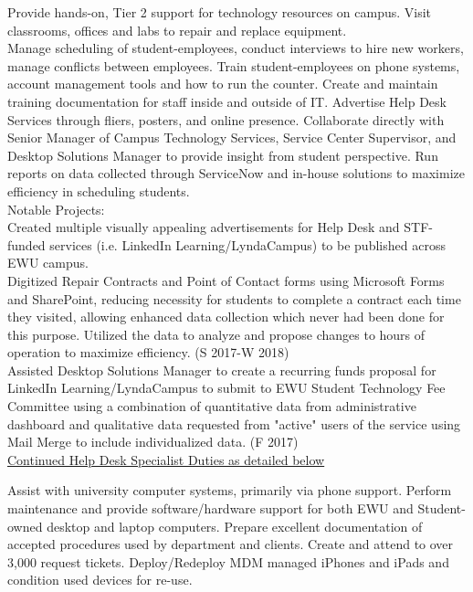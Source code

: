 \documentclass[]{deedy-resume-openfont}
\begin{document}
\begin{minipage}[t]{0.66\textwidth}
\sectionsep
{}
Provide hands-on, Tier 2 support for technology resources on campus. Visit classrooms, offices and labs to repair and replace equipment.
\sectionsep \\
Manage scheduling of student-employees, conduct interviews to hire new workers, manage conflicts between employees. Train student-employees on phone systems, account management tools and how to run the counter. Create and maintain training documentation for staff inside and outside of IT. Advertise Help Desk Services through fliers, posters, and online presence. Collaborate directly with Senior Manager of Campus Technology Services, Service Center Supervisor, and Desktop Solutions Manager to provide insight from student perspective. Run reports on data collected through ServiceNow and in-house solutions to maximize efficiency in scheduling students. 
\\Notable Projects:\\
\textbullet Created multiple visually appealing advertisements for Help Desk and STF-funded services (i.e. LinkedIn Learning/LyndaCampus) to be published across EWU campus.\\
\textbullet Digitized Repair Contracts and Point of Contact forms using Microsoft Forms and SharePoint, reducing necessity for students to complete a contract each time they visited, allowing enhanced data collection which never had been done for this purpose. Utilized the data to analyze and propose changes to hours of operation to maximize efficiency. (S 2017-W 2018)\\
\textbullet Assisted Desktop Solutions Manager to create a recurring funds proposal for LinkedIn Learning/LyndaCampus to submit to EWU Student Technology Fee Committee using a combination of quantitative data from administrative dashboard and qualitative data requested from "active" users of the service using Mail Merge to include individualized data. (F 2017)\\
\underline{Continued Help Desk Specialist Duties as detailed below}\\ 

\sectionsep

Assist with university computer systems, primarily via phone support. Perform maintenance and provide software/hardware support for both EWU and Student-owned desktop and laptop computers. Prepare excellent documentation of accepted procedures used by department and clients. Create and attend to over 3,000 request tickets. Deploy/Redeploy MDM managed iPhones and iPads and condition used devices for re-use.


\end{minipage}
\end{document}
